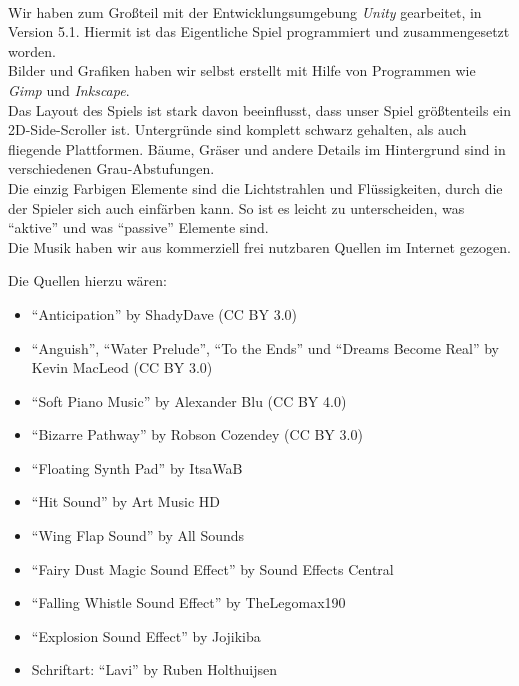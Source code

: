 \documentclass[10pt,a4paper,notitlepage]{report}
\begin{document}
	\\\par\medskip\Text
	Wir haben zum Großteil mit der Entwicklungsumgebung \textit{Unity} gearbeitet, in Version 5.1. Hiermit ist das Eigentliche Spiel programmiert und zusammengesetzt worden.\\
	Bilder und Grafiken haben wir selbst erstellt mit Hilfe von Programmen wie \textit{Gimp} und \textit{Inkscape}.\\
	Das Layout des Spiels ist stark davon beeinflusst, dass unser Spiel größtenteils ein 2D-Side-Scroller ist. Untergründe sind komplett schwarz gehalten, als auch fliegende Plattformen. Bäume, Gräser und andere Details im Hintergrund sind in verschiedenen Grau-Abstufungen.\\
	Die einzig Farbigen Elemente sind die Lichtstrahlen und Flüssigkeiten, durch die der Spieler sich auch einfärben kann. So ist es leicht zu unterscheiden, was \enquote{aktive} und was \enquote{passive} Elemente sind.\\
	Die Musik haben wir aus kommerziell frei nutzbaren Quellen im Internet gezogen.\\\par\smallskip
	Die Quellen hierzu wären:\\
	\begin{itemize}
		\item \enquote{Anticipation} by ShadyDave (CC BY 3.0)
		\item \enquote{Anguish}, \enquote{Water Prelude}, \enquote{To the Ends} und \enquote{Dreams Become Real} by Kevin MacLeod (CC BY 3.0)
		\item \enquote{Soft Piano Music} by Alexander Blu (CC BY 4.0)
		\item \enquote{Bizarre Pathway} by Robson Cozendey (CC BY 3.0)
		\item \enquote{Floating Synth Pad} by ItsaWaB
		\item \enquote{Hit Sound} by Art Music HD
		\item \enquote{Wing Flap Sound} by All Sounds
		\item \enquote{Fairy Dust Magic Sound Effect} by Sound Effects Central
		\item \enquote{Falling Whistle Sound Effect} by TheLegomax190
		\item \enquote{Explosion Sound Effect} by Jojikiba
		\item Schriftart: \enquote{Lavi} by Ruben Holthuijsen
	\end{itemize}
	
\end{document}
